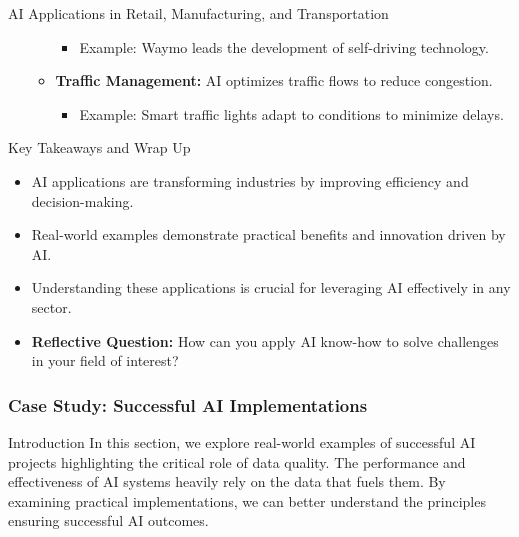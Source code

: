 \documentclass[aspectratio=169]{beamer}
\begin{document}
\begin{frame}[fragile]{AI Applications in Retail, Manufacturing, and Transportation}
\begin{itemize}
\begin{itemize}
                    \begin{itemize}
                        \item Example: Waymo leads the development of self-driving technology.
                    \end{itemize}
                \item \textbf{Traffic Management:} AI optimizes traffic flows to reduce congestion.
                    \begin{itemize}
                        \item Example: Smart traffic lights adapt to conditions to minimize delays.
                    \end{itemize}
            \end{itemize}
    \end{itemize}
\end{frame}

\begin{frame}[fragile]{Key Takeaways and Wrap Up}
    \begin{itemize}
        \item AI applications are transforming industries by improving efficiency and decision-making.
        \item Real-world examples demonstrate practical benefits and innovation driven by AI.
        \item Understanding these applications is crucial for leveraging AI effectively in any sector.
        \item \textbf{Reflective Question:} How can you apply AI know-how to solve challenges in your field of interest?
    \end{itemize}
\end{frame}

\begin{frame}[fragile]
    \frametitle{Case Study: Successful AI Implementations}
    \begin{block}{Introduction}
        In this section, we explore real-world examples of successful AI projects highlighting the critical role of data quality. 
        The performance and effectiveness of AI systems heavily rely on the data that fuels them. 
        By examining practical implementations, we can better understand the principles ensuring successful AI outcomes.
    \end{block}
\end{frame}
\end{document}
